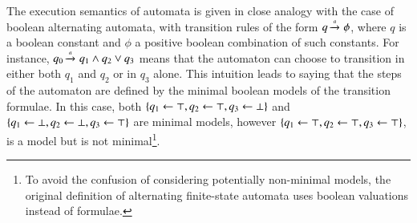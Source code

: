 \documentclass{llncs}
\begin{document}
The execution semantics of automata is given in close analogy with the
case of boolean alternating automata, with transition rules of the
form $q \xrightarrow{{\scriptscriptstyle a}}_{{\scriptstyle }} \phi$, where $q$ is a boolean constant and $\phi$
a positive boolean combination of such constants. For instance, $q_0
\xrightarrow{{\scriptscriptstyle a}}_{{\scriptstyle }} q_1 \wedge q_2 \vee q_3$ means that the automaton can
choose to transition in either both $q_1$ and $q_2$ or in $q_3$
alone. This intuition leads to saying that the steps of the automaton
are defined by the minimal boolean models of the transition
formulae. In this case, both $\{ q_1 \leftarrow \top, q_2 \leftarrow
  \top, q_3 \leftarrow \bot \}$ and $\{ q_1 \leftarrow \bot, q_2
  \leftarrow \bot, q_3 \leftarrow \top \}$ are minimal models, however
$\{ q_1 \leftarrow \top, q_2 \leftarrow \top, q_3 \leftarrow \top \}$,
is a model but is not minimal\footnote{To avoid the confusion of
  considering potentially non-minimal models, the original definition
  of alternating finite-state automata \cite{ChandraKozenStockmeyer81}
  uses boolean valuations instead of formulae.}.
\end{document}
